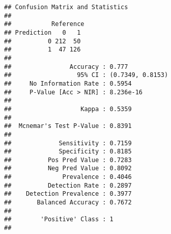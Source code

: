 \documentclass[
]{article}
\newenvironment{Shaded}{\begin{snugshade}}{\end{snugshade}}
\newcommand{\AttributeTok}[1]{\textcolor[rgb]{0.77,0.63,0.00}{#1}}
\newcommand{\CommentTok}[1]{\textcolor[rgb]{0.56,0.35,0.01}{\textit{#1}}}
\newcommand{\DecValTok}[1]{\textcolor[rgb]{0.00,0.00,0.81}{#1}}
\newcommand{\FloatTok}[1]{\textcolor[rgb]{0.00,0.00,0.81}{#1}}
\newcommand{\FunctionTok}[1]{\textcolor[rgb]{0.00,0.00,0.00}{#1}}
\newcommand{\NormalTok}[1]{#1}
\newcommand{\OtherTok}[1]{\textcolor[rgb]{0.56,0.35,0.01}{#1}}
\newcommand{\SpecialCharTok}[1]{\textcolor[rgb]{0.00,0.00,0.00}{#1}}
\newcommand{\StringTok}[1]{\textcolor[rgb]{0.31,0.60,0.02}{#1}}
\begin{document}
\begin{verbatim}
## Confusion Matrix and Statistics
## 
##           Reference
## Prediction   0   1
##          0 212  50
##          1  47 126
##                                           
##                Accuracy : 0.777           
##                  95% CI : (0.7349, 0.8153)
##     No Information Rate : 0.5954          
##     P-Value [Acc > NIR] : 8.236e-16       
##                                           
##                   Kappa : 0.5359          
##                                           
##  Mcnemar's Test P-Value : 0.8391          
##                                           
##             Sensitivity : 0.7159          
##             Specificity : 0.8185          
##          Pos Pred Value : 0.7283          
##          Neg Pred Value : 0.8092          
##              Prevalence : 0.4046          
##          Detection Rate : 0.2897          
##    Detection Prevalence : 0.3977          
##       Balanced Accuracy : 0.7672          
##                                           
##        'Positive' Class : 1               
## 
\end{verbatim}

\begin{Shaded}
\end{Shaded}
\end{document}
